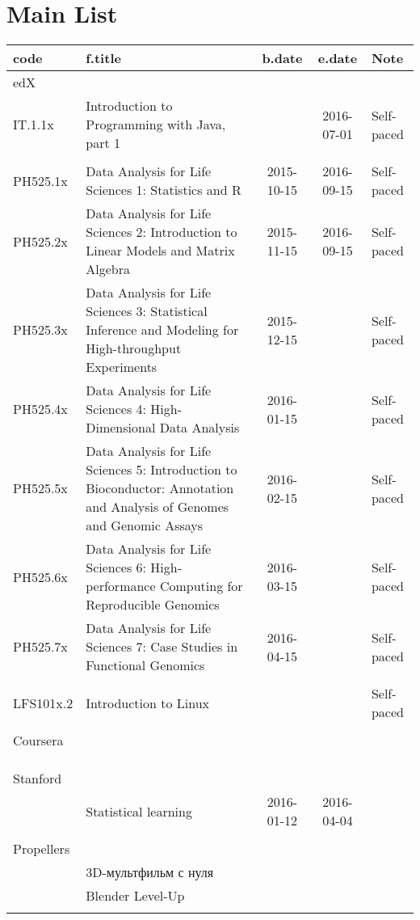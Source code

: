 \documentclass[a4paper,12pt]{article} %
\begin{document}
\tableofcontents

\newpage
\section{Main List}
\begin{longtable}{|l|p{6cm}|c|c|l|}
	\hline
	code & f.title & b.date & e.date & Note \\
	\hline
	\multicolumn{5}{|l|}{edX}\\
	\hline
	IT.1.1x & Introduction to Programming with Java, part 1 &  & 2016-07-01 & Self-paced\\
	\hline
	&  &  &  &  \\
	\hline
	PH525.1x & Data Analysis for Life Sciences 1: Statistics and R & 2015-10-15 & 2016-09-15 & Self-paced \\
	\hline
	PH525.2x & Data Analysis for Life Sciences 2: Introduction to Linear Models and Matrix Algebra & 2015-11-15 & 2016-09-15 & Self-paced \\
	\hline
	PH525.3x & Data Analysis for Life Sciences 3: Statistical Inference and Modeling for High-throughput Experiments & 2015-12-15 &  & Self-paced \\
	\hline
	PH525.4x & Data Analysis for Life Sciences 4: High-Dimensional Data Analysis & 2016-01-15 &  & Self-paced \\
	\hline
	PH525.5x & Data Analysis for Life Sciences 5: Introduction to Bioconductor: Annotation and Analysis of Genomes and Genomic Assays & 2016-02-15 &  & Self-paced \\
	\hline
	PH525.6x & Data Analysis for Life Sciences 6: High-performance Computing for Reproducible Genomics & 2016-03-15 &  & Self-paced \\
	\hline
	PH525.7x & Data Analysis for Life Sciences 7: Case Studies in Functional Genomics & 2016-04-15 &  & Self-paced \\
	\hline
	&  &  &  &  \\
	\hline
	LFS101x.2 & Introduction to Linux &  &  & Self-paced \\
	\hline
	&  &  &  &  \\
	\hline
	\multicolumn{5}{|l|}{Coursera}\\
	\hline
	&  &  &  &  \\
	\hline
	&  &  &  &  \\
	\hline
	&  &  &  &  \\
	\hline
	\multicolumn{5}{|l|}{Stanford}\\
	\hline
	& Statistical learning & 2016-01-12 & 2016-04-04 &  \\
	\hline
	&  &  &  &  \\
	\hline
	\multicolumn{5}{|l|}{Propellers}\\
	\hline
	& 3D-мультфильм с нуля &  &  &  \\
	\hline
	& Blender Level-Up &  &  &  \\
	\hline
	&  &  &  &  \\
	\hline
\end{longtable}
\end{document}
